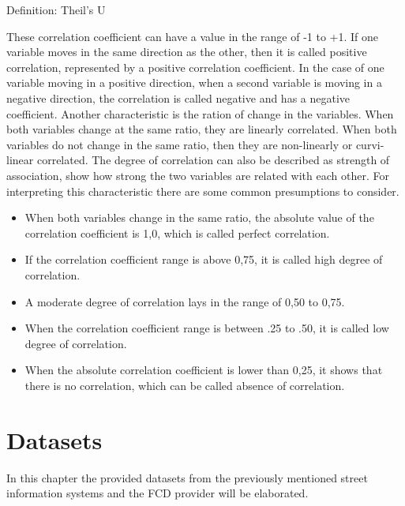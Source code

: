 \documentclass[a4paper,12pt]{report}
\begin{document}
\bigskip

Definition: Theil’s U

\bigskip

These correlation coefficient can have a value in the range of -1 to +1. If one variable moves in the same direction as the other, then it is called positive correlation, represented by a positive correlation coefficient. In the case of one variable moving in a positive direction, when a second variable is moving in a negative direction, the correlation is called negative and has a negative coefficient. Another characteristic is the ration of change in the variables. When both variables change at the same ratio, they are linearly correlated. When both variables do not change in the same ratio, then they are non-linearly or curvi-linear correlated. The degree of correlation can also be described as strength of association, show how strong the two variables are related with each other. For interpreting this characteristic there are some common presumptions to consider.

\begin{itemize}
  \item When both variables change in the same ratio, the absolute value of the correlation coefficient is 1,0, which is called perfect correlation.
  \item If the correlation coefficient range is above 0,75, it is called high degree of correlation.
  \item A moderate degree of correlation lays in the range of 0,50 to 0,75.
  \item When the correlation coefficient range is between .25 to .50, it is called low degree of correlation.
  \item When the absolute correlation coefficient is lower than 0,25, it shows that there is no correlation, which can be called absence of correlation.
\end{itemize}	
	
\chapter{Datasets}
In this chapter the provided datasets from the previously mentioned street information systems and the FCD provider will be elaborated. 
\end{document}

